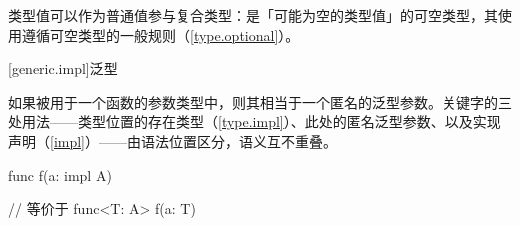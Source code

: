 \pnum
类型值可以作为普通值参与复合类型：是「可能为空的类型值」的可空类型，其使用遵循可空类型的一般规则（\ref{type.optional}）。

[generic.impl]{泛型}

\pnum
如果被用于一个函数的参数类型中，则其相当于一个匿名的泛型参数。关键字的三处用法——类型位置的存在类型（\ref{type.impl}）、此处的匿名泛型参数、以及实现声明（\ref{impl}）——由语法位置区分，语义互不重叠。

\enterexample
\begin{codeblock}

func f(a: impl A) { }

// 等价于
func<T: A> f(a: T) { }

\end{codeblock}
\exitexample
